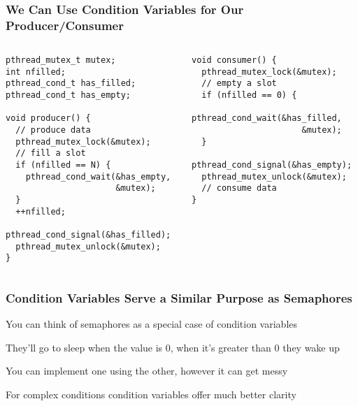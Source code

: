   \begin{frame}[fragile]
    \frametitle{We Can Use Condition Variables for Our Producer/Consumer}

    \begin{columns}
      \begin{column}{0.5\textwidth}
        \begin{lstlisting}
pthread_mutex_t mutex;
int nfilled;
pthread_cond_t has_filled;
pthread_cond_t has_empty;

void producer() {
  // produce data
  pthread_mutex_lock(&mutex);
  // fill a slot
  if (nfilled == N) {
    pthread_cond_wait(&has_empty,
                      &mutex);
  }
  ++nfilled;
  pthread_cond_signal(&has_filled);
  pthread_mutex_unlock(&mutex);
}
        \end{lstlisting}
      \end{column}
      \begin{column}{0.5\textwidth}
        \begin{lstlisting}
void consumer() {
  pthread_mutex_lock(&mutex);
  // empty a slot
  if (nfilled == 0) {
    pthread_cond_wait(&has_filled,
                      &mutex);
  }
  pthread_cond_signal(&has_empty);
  pthread_mutex_unlock(&mutex);
  // consume data
}
        \end{lstlisting}
      \end{column}
    \end{columns}
  \end{frame}

  \begin{frame}
    \frametitle{Condition Variables Serve a Similar Purpose as Semaphores}

    You can think of semaphores as a special case of condition variables

    \hspace{2em} They'll go to sleep when the value is 0, when it's greater
    than 0 they wake up

    \vspace{2em}

    You can implement one using the other, however it can get messy

    \vspace{2em}

    For complex conditions condition variables offer much better clarity
  \end{frame}

